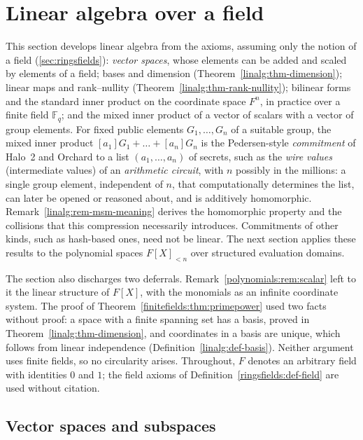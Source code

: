 \documentclass[11pt,a4paper]{article}
\theoremstyle{definition}
\theoremstyle{remark}
\newcommand{\Fq}{\ensuremath{\mathbb{F}_{q}}}
\begin{document}
\section{Linear algebra over a field}\label{sec:linalg}

This section develops linear algebra from the axioms, assuming only the
notion of a field (\cref{sec:ringsfields}): \emph{vector spaces}, whose
elements can be added and scaled by elements of a field; bases and
dimension (Theorem~\ref{linalg:thm-dimension}); linear maps and
rank--nullity (Theorem~\ref{linalg:thm-rank-nullity}); bilinear forms and
the standard inner product on the coordinate space \(F^n\), in practice
over a finite field \(\Fq\); and the mixed inner product of a vector of
scalars with a vector of group elements. For fixed public elements
\(G_1, \dots, G_n\) of a suitable group, the mixed inner product
\([a_1]G_1 + \dots + [a_n]G_n\) is the Pedersen-style \emph{commitment} of
Halo~2 and Orchard to a list \((a_1, \dots, a_n)\) of secrets, such as the
\emph{wire values} (intermediate values) of an \emph{arithmetic circuit},
with \(n\) possibly in the millions: a single group element, independent
of \(n\), that computationally determines the list, can later be opened or
reasoned about, and is additively homomorphic.
Remark~\ref{linalg:rem-msm-meaning} derives the homomorphic property and
the collisions that this compression necessarily introduces. Commitments
of other kinds, such as hash-based ones, need not be linear. The next
section applies these results to the polynomial spaces \(F[X]_{<n}\) over
structured evaluation domains.

The section also discharges two deferrals.
Remark~\ref{polynomials:rem:scalar} left to it the linear structure of
\(F[X]\), with the monomials as an infinite coordinate system. The proof
of Theorem~\ref{finitefields:thm:primepower} used two facts without
proof: a space with a finite spanning set has a basis, proved in
Theorem~\ref{linalg:thm-dimension}, and coordinates in a basis are
unique, which follows from linear independence
(Definition~\ref{linalg:def-basis}). Neither argument uses finite fields,
so no circularity arises. Throughout, \(F\) denotes an arbitrary field
with identities \(0\) and \(1\); the field axioms of
Definition~\ref{ringsfields:def-field} are used without citation.

\subsection{Vector spaces and subspaces}\label{linalg:subsec-vs}
\end{document}

